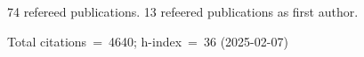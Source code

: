 74 refereed publications. 13 refeered publications as first author.

Total citations~=~4640; h-index~=~36 (2025-02-07)
